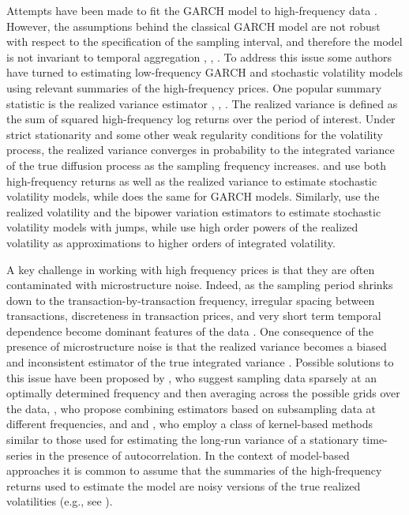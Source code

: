 Attempts have been made to fit the GARCH model to high-frequency data
\cite{bollerslev1986,andersen1997intraday}.  However, the assumptions
behind the classical GARCH model are not robust with respect to the
specification of the sampling interval, and therefore the model is not
invariant to temporal aggregation \cite{drost1993aggregation},
\cite{andersen1997intraday}, \cite{zumbach2000pitfalls}.  To address
this issue some authors have turned to estimating low-frequency GARCH
and stochastic volatility models using relevant summaries of the
high-frequency prices. One popular summary statistic is the realized
variance estimator \cite{comte1998long},
\cite{andersen2001distribution}, \cite{barndorff2002estimating}.  The
realized variance is defined as the sum of squared high-frequency log
returns over the period of interest.  Under strict stationarity and
some other weak regularity conditions for the volatility process, the
realized variance converges in probability to the integrated variance
of the true diffusion process as the sampling frequency increases.
\cite{takahashi2009estimating} and \cite{shirota2014realized} use both
high-frequency returns as well as the realized variance to estimate
stochastic volatility models, while \cite{hansen2012realized} does the
same for GARCH models.  Similarly, \cite{maneesoonthorn2014inference}
use the realized volatility and the bipower variation estimators to
estimate stochastic volatility models with jumps, while
\cite{bollerslev2002estimating} use high order powers of the realized
volatility as approximations to higher orders of integrated
volatility.

A key challenge in working with high frequency prices is that they are
often contaminated with microstructure noise. Indeed, as the sampling
period shrinks down to the transaction-by-transaction frequency,
irregular spacing between transactions, discreteness in transaction
prices, and very short term temporal dependence become dominant
features of the data \cite{stoll2000presidential}.  One consequence of
the presence of microstructure noise is that the realized variance
becomes a biased and inconsistent estimator of the true integrated
variance \cite{zhou1996high}.  Possible solutions to this issue have
been proposed by \cite{zhang2005tale}, who suggest sampling data
sparsely at an optimally determined frequency and then averaging
across the possible grids over the data, \cite{ait2011ultra}, who
propose combining estimators based on subsampling data at different
frequencies, and \cite{hansen2006realized} and
\cite{barndorff2008designing}, who employ a class of kernel-based
methods similar to those used for estimating the long-run variance of
a stationary time-series in the presence of autocorrelation. In the
context of model-based approaches it is common to assume that the
summaries of the high-frequency returns used to estimate the model are
noisy versions of the true realized volatilities (e.g., see
\cite{venter2012extended, shirota2014realized}).

